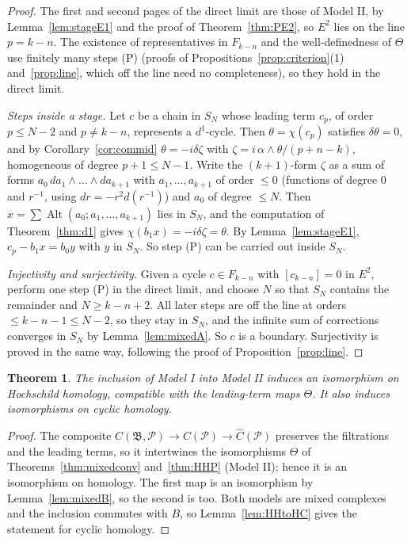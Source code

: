 \documentclass[11pt,oneside,reqno]{article}
\newcommand{\cP}{\mathcal P}
\newcommand{\Chat}{\widehat C}
\theoremstyle{plain}
\newtheorem{theorem}{Theorem}[section]
\theoremstyle{definition}
\theoremstyle{remark}
\begin{document}
\begin{proof}
The first and second pages of the direct limit are those of Model II, by
Lemma~\ref{lem:stageE1} and the proof of Theorem~\ref{thm:PE2}, so \(E^2\) lies on the line
\(p=k-n\). The existence of representatives in \(F_{k-n}\) and the well-definedness of \(\Theta\) use
finitely many steps (P) (proofs of Propositions~\ref{prop:criterion}(1)
and~\ref{prop:line}, which off the line need no completeness), so they hold in the
direct limit.

\emph{Steps inside a stage.} Let \(c\) be a chain in \(S_N\) whose leading term \(c_p\), of order
\(p\le N-2\) and \(p\ne k-n\), represents a \(d^1\)-cycle. Then \(\theta=\chi(c_p)\) satisfies \(\delta\theta=0\), and by
Corollary~\ref{cor:commid} \(\theta=-i\delta\zeta\) with \(\zeta=i\,\alpha\wedge\theta/(p+n-k)\), homogeneous of degree
\(p+1\le N-1\). Write the \((k+1)\)-form \(\zeta\) as a sum of forms \(a_0\,da_1\wedge\dots\wedge da_{k+1}\) with
\(a_1,\dots,a_{k+1}\) of order
\(\le0\) (functions of degree \(0\) and \(r^{-1}\), using \(dr=-r^2d(r^{-1})\)) and \(a_0\) of degree \(\le N\). Then
\(x=\sum\operatorname{Alt}(a_0;a_1,\dots,a_{k+1})\) lies in \(S_N\), and the computation of Theorem~\ref{thm:d1}
gives \(\chi(b_1x)=-i\delta\zeta=\theta\). By Lemma~\ref{lem:stageE1}, \(c_p-b_1x=b_0y\) with \(y\) in \(S_N\). So
step (P) can be carried out inside \(S_N\).

\emph{Injectivity and surjectivity.} Given a cycle \(c\in F_{k-n}\) with \([c_{k-n}]=0\) in \(E^2\),
perform one step (P) in the direct limit, and choose \(N\) so that \(S_N\) contains the
remainder and \(N\ge k-n+2\). All later steps are off the line at orders \(\le k-n-1\le N-2\),
so they stay in \(S_N\), and the infinite sum of corrections converges in \(S_N\) by
Lemma~\ref{lem:mixedA}. So \(c\) is a boundary. Surjectivity is proved in the same way,
following the proof of Proposition~\ref{prop:line}.
\end{proof}

\begin{theorem}\label{thm:modelI}
The inclusion of Model I into Model II induces an isomorphism on Hochschild homology,
compatible with the leading-term maps \(\Theta\). It also induces isomorphisms on cyclic
homology.
\end{theorem}

\begin{proof}
The composite \(C(\mathfrak B,\cP)\to C(\cP)\to\Chat(\cP)\) preserves the filtrations and the leading
terms, so it intertwines the isomorphisms \(\Theta\) of Theorems~\ref{thm:mixedconv}
and~\ref{thm:HHP} (Model II); hence it is an isomorphism on homology. The first map is
an isomorphism by Lemma~\ref{lem:mixedB}, so the second is too. Both models are mixed
complexes and the inclusion commutes with \(B\), so Lemma~\ref{lem:HHtoHC} gives the
statement for cyclic homology.
\end{proof}
\end{document}
